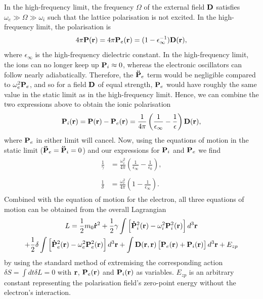 In the high-frequency limit, the frequency $\Omega$ of the external field $\vb{D}$ satisfies $\omega_e \gg \Omega \gg \omega_i$ such that the lattice polarisation is not excited. In the high-frequency limit, the polarisation is
\begin{equation}
    4\pi\vb{P}(\vb{r}) = 4\pi\vb{P}_e(\vb{r}) = (1 - \epsilon_\infty^{-1}) \vb{D}(\vb{r}),
\label{eqn-2121-10}
\end{equation}
where $\epsilon_\infty$ is the high-frequency dielectric constant. In the high-frequency limit, the ions can no longer keep up $\vb{P}_{i} \approx 0$, whereas the electronic oscillators can follow nearly adiabatically. Therefore, the $\vb{\ddot{P}}_{e}$ term would be negligible compared to $\omega^2_{e} \vb{P}_{e}$, and so for a field $\vb{D}$ of equal strength, $\vb{P}_e$ would have roughly the same value in the static limit as in the high-frequency limit. Hence, we can combine the two expressions above to obtain the ionic polarisation
\begin{equation}
    \vb{P}_i(\vb{r}) = \vb{P}(\vb{r}) - \vb{P}_e(\vb{r}) = \frac{1}{4\pi} \left(\frac{1}{\epsilon_\infty} - \frac{1}{\epsilon} \right) \vb{D}(\vb{r}),
\label{eqn-2121-11}
\end{equation}
where $\vb{P}_e$ in either limit will cancel. Now, using the equations of motion in the static limit ($\vb{\ddot{P}}_{e} = \vb{\ddot{P}}_{i} = 0$) and our expressions for $\vb{P}_i$ and $\vb{P}_e$ we find
\begin{subequations}
\begin{align}
    \begin{split}
        \frac{1}{\gamma} &= \frac{\omega_{i}^2}{4\pi} \left(\frac{1}{\epsilon_\infty} - \frac{1}{\epsilon_0} \right),
    \end{split}\\
    \begin{split}
        \frac{1}{\delta} &= \frac{\omega_{e}^2}{4\pi} \left(1 - \frac{1}{\epsilon_\infty} \right).
    \end{split}
\end{align}
\label{eqn-2121-12}
\end{subequations}
Combined with the equation of motion for the electron, all three equations of motion can be obtained from the overall Lagrangian
\begin{equation}
\begin{gathered}
    L = \frac{1}{2} m_0 \vb{\dot{r}}^2 + \frac{1}{2} \gamma \int \left[ \vb{\dot{P}}_{i}^2(\vb{r}) - \omega_i^2 \vb{P}^2_i (\vb{r}) \right] d^3 \vb{r} \\
    + \frac{1}{2} \delta \int \left[ \vb{\dot{P}}_{e}^2(\vb{r}) - \omega_e^2 \vb{P}^2_e (\vb{r}) \right] d^3 \vb{r} + \int \vb{D}(\vb{r}, \vb{r})\left[\vb{P}_e(\vb{r})+\vb{P}_i(\vb{r})\right] d^3\vb{r} + E_{zp}
\end{gathered}
\label{eqn-2121-13}
\end{equation}
by using the standard method of extremising the corresponding action $\delta S = \int dt \delta L = 0$ with $\vb{r}$, $\vb{P}_e(\vb{r})$ and $\vb{P}_i(\vb{r})$ as variables. $E_{zp}$ is an arbitrary constant representing the polarisation field's zero-point energy without the electron's interaction. 


